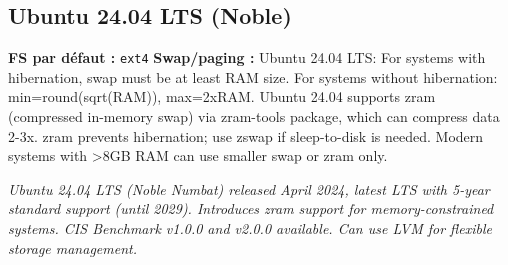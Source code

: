 \documentclass[10pt,a4paper]{article}
\begin{document}
\subsection{Ubuntu 24.04 LTS (Noble)}
\noindent\small \textbf{FS par d\'efaut :} \texttt{ext4} \quad\textbullet\quad \textbf{Swap/paging :} Ubuntu 24.04 LTS: For systems with hibernation, swap must be at least RAM size. For systems without hibernation: min=round(sqrt(RAM)), max=2xRAM. Ubuntu 24.04 supports zram (compressed in-memory swap) via zram-tools package, which can compress data 2-3x. zram prevents hibernation; use zswap if sleep-to-disk is needed. Modern systems with >8GB RAM can use smaller swap or zram only.\normalsize\par\smallskip
\noindent\small\textit{Ubuntu 24.04 LTS (Noble Numbat) released April 2024, latest LTS with 5-year standard support (until 2029). Introduces zram support for memory-constrained systems. CIS Benchmark v1.0.0 and v2.0.0 available. Can use LVM for flexible storage management.}\normalsize\par\smallskip
\end{document}
